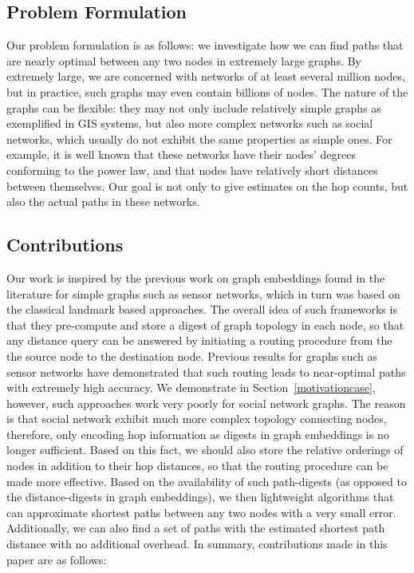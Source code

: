 \subsection{Problem Formulation}

Our problem formulation is as follows: we investigate how we can find paths that are nearly optimal between any two nodes in extremely large graphs. By extremely large, we are concerned with networks of at least several million nodes, but in practice, such graphs may even contain billions of nodes. The nature of the graphs can be flexible: they may not only include relatively simple graphs as exemplified in GIS systems, but also more complex networks such as social networks, which usually do not exhibit the same properties as simple ones. For example, it is well known that these networks have their nodes' degrees conforming to the power law, and that nodes have relatively short distances between themselves. Our goal is not only to give estimates on the hop counts, but also the actual paths in these networks.

\subsection{Contributions}

Our work is inspired by the previous work on graph embeddings found in the literature for simple graphs such as sensor networks, which in turn was based on the classical landmark based approaches. The overall idea of such frameworks is that they pre-compute and store a digest of graph topology in each node, so that any distance query can be answered by initiating a routing procedure from the the source node to the destination node. Previous results for graphs such as sensor networks have demonstrated that such routing leads to near-optimal paths with extremely high accuracy. We demonstrate in Section~\ref{motivationcase}, however, such approaches work very poorly for social network graphs. The reason is that social network exhibit much more complex topology connecting nodes, therefore, only encoding hop information as digests in graph embeddings is no longer sufficient. Based on this fact, we should also store the relative orderings of nodes in addition to their hop distances, so that the routing procedure can be made more effective. Based on the availability of such path-digests (as opposed to the distance-digests in graph embeddings), we then lightweight algorithms that can approximate shortest paths between any two nodes with a very small error. Additionally, we can also find a set of paths with the estimated shortest path distance with no additional overhead. In summary, contributions made in this paper are as follows:

